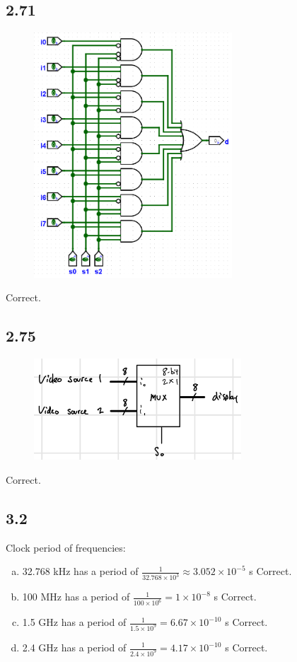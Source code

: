 \documentclass{article}
\begin{document}
\subsection*{2.71}
\begin{figure}[H]
    \centering
    \includegraphics[width=0.66\textwidth]{./images/2_71.png}
\end{figure}
\textcolor{mygreen}{Correct.}

\subsection*{2.75}
\begin{figure}[H]
    \centering
    \includegraphics[width=0.69\textwidth]{./images/2_75.jpg}
\end{figure}
\textcolor{mygreen}{Correct.}

\newpage
\subsection*{3.2}
Clock period of frequencies:
\begin{enumerate}[(a)]
    \item 32.768 kHz has a period of $\frac{1}{32.768 \times 10^3} \approx 3.052 \times 10^{-5}$ s \textcolor{mygreen}{Correct.}
    \item 100 MHz has a period of $\frac{1}{100 \times 10^6} = 1 \times 10^{-8}$ s \textcolor{mygreen}{Correct.}
    \item 1.5 GHz has a period of $\frac{1}{1.5 \times 10^9} = 6.67 \times 10^{-10}$ s \textcolor{mygreen}{Correct.}
    \item 2.4 GHz has a period of $\frac{1}{2.4 \times 10^9} = 4.17 \times 10^{-10}$ s \textcolor{mygreen}{Correct.}
\end{enumerate}
\end{document}
